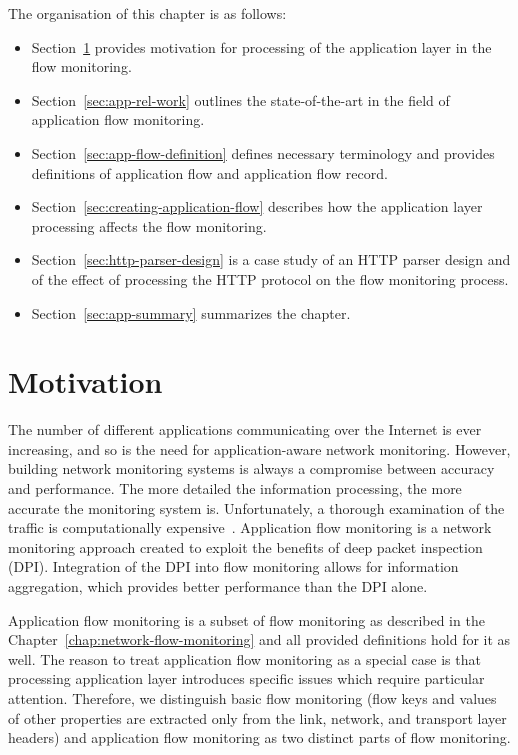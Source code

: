 \begin{chapintro}
The organisation of this chapter is as follows:
\begin{itemize}
  \item Section~\ref{sec:app-motivation} provides motivation for processing of the application layer in the flow monitoring.
  \item Section~\ref{sec:app-rel-work} outlines the state-of-the-art in the field of application flow monitoring.
  \item Section~\ref{sec:app-flow-definition} defines necessary terminology and provides definitions of application flow and application flow record.
  \item Section~\ref{sec:creating-application-flow} describes how the application layer processing affects the flow monitoring.
  \item Section~\ref{sec:http-parser-design} is a case study of an HTTP parser design and of the effect of processing the HTTP protocol on the flow monitoring process.
  \item Section~\ref{sec:app-summary} summarizes the chapter.
\end{itemize}

\end{chapintro}

\newpage

\section{Motivation}\label{sec:app-motivation}

The number of different applications communicating over the Internet is ever increasing, and so is the need for application-aware network monitoring. However, building network monitoring systems is always a compromise between accuracy and performance. The more detailed the information processing, the more accurate the monitoring system is. Unfortunately, a thorough examination of the traffic is computationally expensive~\cite{Gao-2006-Efficient, Lai-2004-Parallel}. Application flow monitoring is a network monitoring approach created to exploit the benefits of deep packet inspection (DPI). Integration of the DPI into flow monitoring allows for information aggregation, which provides better performance than the DPI alone.

Application flow monitoring is a subset of flow monitoring as described in the Chapter~\ref{chap:network-flow-monitoring} and all provided definitions hold for it as well. The reason to treat application flow monitoring as a special case is that processing application layer introduces specific issues which require particular attention. Therefore, we distinguish basic flow monitoring (flow keys and values of other properties are extracted only from the link, network, and transport layer headers) and application flow monitoring as two distinct parts of flow monitoring.

